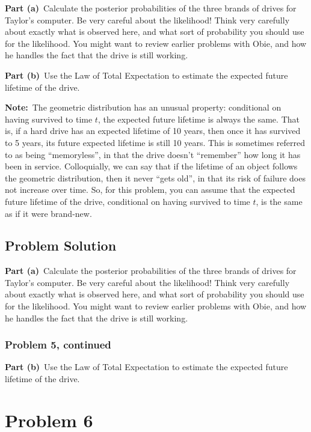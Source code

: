 \documentclass[12pt]{article}
\theoremstyle{definition}
\begin{document}
\bigskip
\noindent
{\bf Part (a)}\ Calculate the posterior probabilities of the three brands of drives for Taylor's computer. Be very careful about the likelihood! Think very carefully about exactly what is observed here, and what sort of probability you should use for the likelihood. You might want to review earlier problems with Obie, and how he handles the fact that the drive is still working.

\bigskip
\noindent
{\bf Part (b)}\ Use the Law of Total Expectation to estimate the expected future lifetime of the drive.

\bigskip
\noindent
{\bf Note:}\ The geometric distribution has an unusual property: conditional on having survived to time $t$, the expected future lifetime is always the same. That is, if a hard drive has an expected lifetime of 10 years, then once it has survived to 5 years, its future expected lifetime is still 10 years. This is sometimes referred to as being ``memoryless'', in that the drive doesn't ``remember'' how long it has been in service. Colloquially, we can say that if the lifetime of an object follows the geometric distribution, then it never ``gets old'', in that its risk of failure does not increase over time. So, for this problem, you can assume that the expected future lifetime of the drive, conditional on having survived to time $t$, is the same as if it were brand-new.


\newpage
\subsection*{Problem Solution}

\noindent
{\bf Part (a)}\ Calculate the posterior probabilities of the three brands of drives for Taylor's computer. Be very careful about the likelihood! Think very carefully about exactly what is observed here, and what sort of probability you should use for the likelihood. You might want to review earlier problems with Obie, and how he handles the fact that the drive is still working.

\newpage
\subsubsection*{Problem 5, continued}

\noindent
{\bf Part (b)}\ Use the Law of Total Expectation to estimate the expected future lifetime of the drive.


\newpage
\section*{Problem 6}
\end{document}
